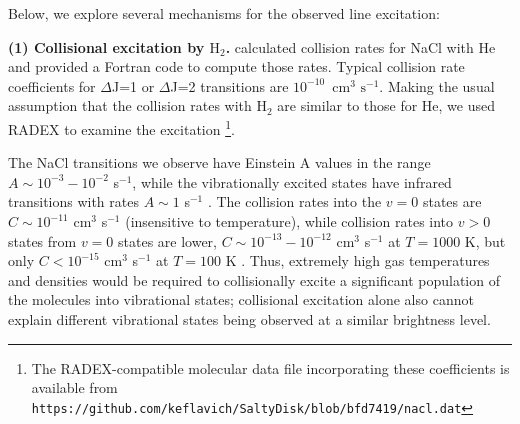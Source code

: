 \documentclass[12pt]{article}
\newcommand{\hh}{\ensuremath{\textrm{H}_{2}}\xspace}			%
\newcommand{\pers}{\ensuremath{\mathrm{s}^{-1}}\xspace}
\newcommand{\kms}{\textrm{km~s}\ensuremath{^{-1}}\xspace}	%
\newcommand{\persc}{\ensuremath{\textrm{cm}^{-2}}\xspace}
\begin{document}
Below, we explore several mechanisms for the observed line excitation:

\par{\textbf{(1) Collisional excitation by \hh.}} 
%
%
\cite{Quintana-Lacaci2016a} calculated collision rates for NaCl with He and
provided a Fortran code to compute those rates.  Typical collision rate
coefficients for \hbox{$\Delta$J=1} or \hbox{$\Delta$J=2} transitions are
$10^{-10}$~cm$^3$ \pers.  Making the usual assumption that the collision rates
with \hh are similar to those for He, we used RADEX \cite{van-der-Tak2007a} to
examine the excitation \footnote{The
RADEX-compatible molecular data
file incorporating these coefficients is available from
\texttt{https://github.com/keflavich/SaltyDisk/blob/bfd7419/nacl.dat}}.

The NaCl transitions we observe have  Einstein A values in the range
$A\sim10^{-3}-10^{-2}$ s$^{-1}$, while the vibrationally excited states have
infrared transitions with rates $A\sim1$ s$^{-1}$
\cite{Barton2014a,Cabezas2016a}.  The collision rates into the $v=0$ states are
$C\sim10^{-11}$ cm$^3$ s$^{-1}$ (insensitive to temperature), while collision
rates into $v>0$ states from $v=0$ states are lower, $C\sim10^{-13}-10^{-12}$
cm$^3$ s$^{-1}$ at $T=1000$ K, but only $C < 10^{-15}$  cm$^3$ s$^{-1}$ at
$T=100$ K \cite{Quintana-Lacaci2016a}.  Thus, extremely high gas temperatures
and densities would be required to collisionally excite a significant
population of the molecules into vibrational states; collisional excitation
alone also cannot explain different vibrational states being observed at a
similar brightness level.
\end{document}
